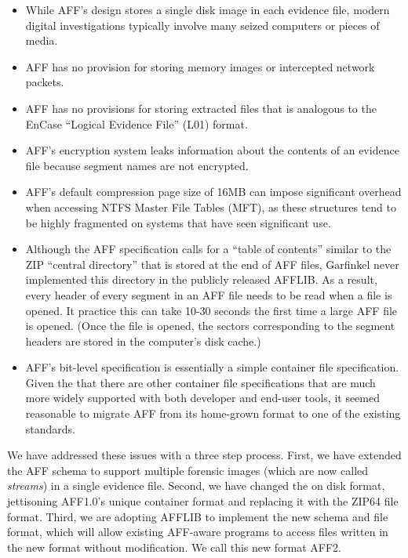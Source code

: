 \documentclass[10pt, conference]{IEEEtran}
\begin{document}
\begin{itemize}
\item While AFF's design stores a single disk image in each evidence
  file, modern digital investigations typically involve many seized
  computers or pieces of media. 
\item AFF has no provision for storing memory images or intercepted
  network packets.
\item AFF has no provisions for storing extracted files that is
  analogous to the EnCase ``Logical Evidence File'' (L01) format.
\item AFF's encryption system leaks information about the contents of
  an evidence file because segment names are not encrypted.
\item AFF's default compression page size of 16MB can impose significant overhead
  when accessing NTFS Master File Tables (MFT), as these structures
  tend to be highly fragmented on systems that have seen significant
  use. 
\item Although the AFF specification calls for a ``table of contents'' similar
  to the ZIP\cite{zip-format} ``central directory'' that is stored at the end of AFF
  files, Garfinkel never implemented this directory in the publicly
  released AFFLIB. As a result, every header of every segment in an
  AFF file needs to be read when a file is opened. It practice this
  can take 10-30 seconds the first time a large AFF file is
  opened. (Once the file is opened, the sectors corresponding to the
  segment headers are stored in the computer's disk cache.)
\item AFF's bit-level specification is essentially a simple container
  file specification. Given the that there are other container file
  specifications that are much more widely supported with both
  developer and end-user tools, it seemed reasonable to migrate AFF
  from its home-grown format to one of the existing standards.
\end{itemize}

We have addressed these issues with a three step process. First, we
have extended the AFF schema to support multiple forensic images
(which are now called \emph{streams}) in a single evidence
file. Second, we have changed the on disk format, jettisoning AFF1.0's
unique container format and replacing it with the ZIP64 file
format. Third, we are adopting AFFLIB to implement the new schema and
file format, which will allow existing AFF-aware programs to access
files written in the new format without modification. We call this new
format AFF2.
\end{document}
